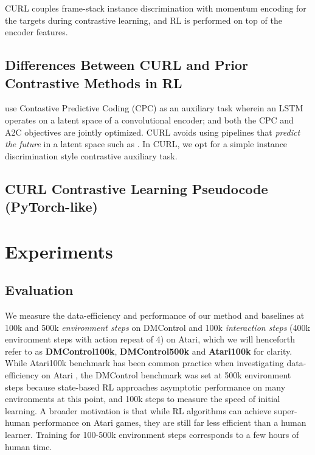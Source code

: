 \documentclass{article}
\begin{document}
CURL couples frame-stack instance discrimination with momentum encoding for the targets during contrastive learning, and RL is performed on top of the encoder features. 


\subsection{Differences Between CURL and Prior Contrastive Methods in RL}

\citet{oord2018representation} use Contastive Predictive Coding (CPC) as an auxiliary task wherein an LSTM operates on a latent space of a convolutional encoder; and both the CPC and A2C \cite{mnih2015human} objectives are jointly optimized. CURL avoids using pipelines that {\it predict the future} in a latent space such as \citet{oord2018representation, hafner2019dream}. In CURL, we opt for a simple instance discrimination style contrastive auxiliary task. 

\subsection{CURL Contrastive Learning Pseudocode (PyTorch-like)}\label{pytorch}




 \section{Experiments}

\subsection{Evaluation}

We measure the data-efficiency and performance of our method and baselines at 100k and 500k \textit{environment steps} on DMControl and 100k \textit{interaction steps} (400k environment steps with action repeat of 4) on Atari, which we will henceforth refer to as \textbf{DMControl100k}, \textbf{DMControl500k} and \textbf{Atari100k} for clarity. While Atari100k benchmark has been common practice when  investigating data-efficiency on Atari  \cite{kaiser2019model, van2019use, kielak2020rainbow}, the DMControl benchmark was set at 500k environment steps because state-based RL approaches asymptotic performance on many environments at this point, and 100k steps to measure the speed of initial learning. A broader motivation is that while RL algorithms can achieve super-human performance on Atari games, they are still far less efficient than a human learner. Training for 100-500k environment steps corresponds to a few hours of human time. 
\end{document}
